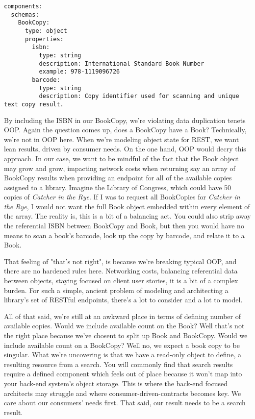 \begin{minipage}{\linewidth}
\begin{code}
\begin{lstlisting}[belowskip=-\baselineskip]
components:
  schemas:
    BookCopy:
      type: object
      properties:
        isbn:
          type: string
          description: International Standard Book Number
          example: 978-1119096726
        barcode:
          type: string
          description: Copy identifier used for scanning and unique text copy result.
\end{lstlisting}
\end{code}
\end{minipage}

By including the ISBN in our BookCopy, we're violating data duplication tenets OOP.  Again the question comes up, does a BookCopy have a Book?  Technically, we're not in OOP here.  When we're modeling object state for REST, we want lean results, driven by consumer needs.  On the one hand, OOP would decry this approach.  In our case, we want to be mindful of the fact that the Book object may grow and grow, impacting network costs when returning say an array of BookCopy results when providing an endpoint for all of the available copies assigned to a library.  Imagine the Library of Congress, which could have 50 copies of \textit{Catcher in the Rye}.  If I was to request all BookCopies for \textit{Catcher in the Rye}, I would not want the full Book object embedded within every element of the array.  The reality is, this is a bit of a balancing act.  You could also strip away the referential ISBN between BookCopy and Book, but then you would have no means to scan a book's barcode, look up the copy by barcode, and relate it to a Book.

That feeling of "that's not right", is because we're breaking typical OOP, and there are no hardened rules here.  Networking costs, balancing referential data between objects, staying focused on client user stories, it is a bit of a complex burden.  For such a simple, ancient problem of modeling and architecting a library's set of RESTful endpoints, there's a lot to consider and a lot to model.

All of that said, we're still at an awkward place in terms of defining number of available copies.  Would we include available count on the Book?  Well that's not the right place because we've chosent to split up Book and BookCopy.  Would we include available count on a BookCopy?  Well no, we expect a book copy to be singular.  What we're uncovering is that we have a read-only object to define, a resulting resource from a search.  You will commonly find that search results require a defined component which feels out of place because it won't map into your back-end system's object storage.  This is where the back-end focused architects may struggle and where consumer-driven-contracts becomes key.  We care about our consumers' needs first.  That said, our result needs to be a search result.

